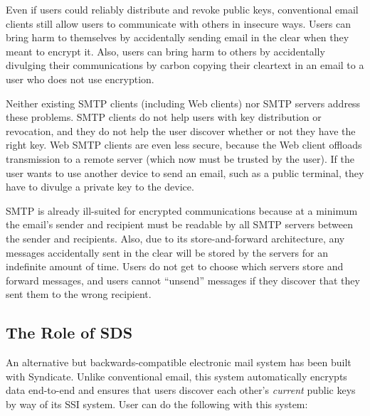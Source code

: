 Even if users could reliably distribute and revoke public keys, conventional
email clients still allow users to communicate with others in insecure ways.
Users can bring harm to themselves by accidentally sending email in the clear
when they meant to encrypt it.  Also, users can bring harm to others
by accidentally divulging their communications by carbon copying
their cleartext in an email to a user who does not use encryption.

Neither existing SMTP clients (including Web clients) nor
SMTP servers address these problems.  SMTP clients do not help users with key
distribution or revocation, and they do not help the user discover whether or
not they have the right key.  Web SMTP clients are even less secure, because the
Web client offloads transmission to a remote server (which now must be trusted
by the user).  If the user wants to use another device to send an email, such as
a public terminal, they have to divulge a private key to the device.

SMTP is already ill-suited for encrypted communications because at a minimum the email's
sender and recipient must be readable by all SMTP servers between the sender and
recipients.  Also, due to its store-and-forward architecture, any messages
accidentally sent in the clear will be stored by the servers for an
indefinite amount of time.  Users do not get to choose which servers store and forward
messages, and users cannot ``unsend'' messages if they discover that they sent
them to the wrong recipient.

\subsection{The Role of SDS}

An alternative but backwards-compatible electronic mail system has been built
with Syndicate.  Unlike conventional email, this system
automatically encrypts data end-to-end and ensures that users
discover each other's \emph{current} public keys by way of its SSI
system.  User can do the following with this system:

